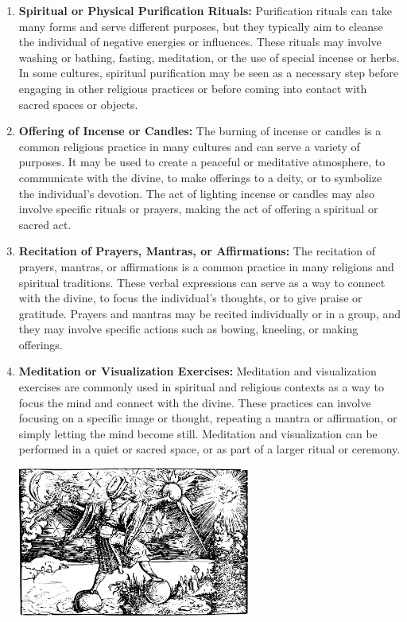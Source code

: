 \documentclass[12pt]{book}  %
\begin{document}
\begin{enumerate}
    \item \textbf{Spiritual or Physical Purification Rituals:}
    Purification rituals can take many forms and serve different purposes, but they typically aim to cleanse the individual of negative energies or influences. These rituals may involve washing or bathing, fasting, meditation, or the use of special incense or herbs. In some cultures, spiritual purification may be seen as a necessary step before engaging in other religious practices or before coming into contact with sacred spaces or objects.
    
    \item \textbf{Offering of Incense or Candles:}
    The burning of incense or candles is a common religious practice in many cultures and can serve a variety of purposes. It may be used to create a peaceful or meditative atmosphere, to communicate with the divine, to make offerings to a deity, or to symbolize the individual's devotion. The act of lighting incense or candles may also involve specific rituals or prayers, making the act of offering a spiritual or sacred act.
    
    \item \textbf{Recitation of Prayers, Mantras, or Affirmations:}
    The recitation of prayers, mantras, or affirmations is a common practice in many religions and spiritual traditions. These verbal expressions can serve as a way to connect with the divine, to focus the individual's thoughts, or to give praise or gratitude. Prayers and mantras may be recited individually or in a group, and they may involve specific actions such as bowing, kneeling, or making offerings.
    
    \item \textbf{Meditation or Visualization Exercises:}
    Meditation and visualization exercises are commonly used in spiritual and religious contexts as a way to focus the mind and connect with the divine. These practices can involve focusing on a specific image or thought, repeating a mantra or affirmation, or simply letting the mind become still. Meditation and visualization can be performed in a quiet or sacred space, or as part of a larger ritual or ceremony.

    \begin{center}
        \includegraphics[width=0.6\textwidth]{./images/religion08.pdf}
    \end{center}


\end{enumerate}
\end{document}
